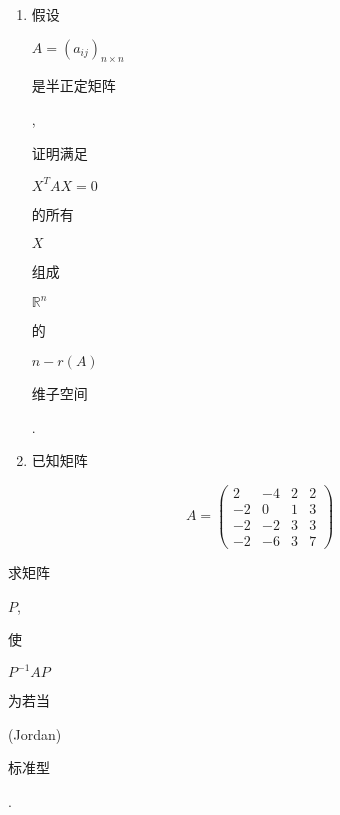 \documentclass[10pt]{article}
\begin{document}
\begin{enumerate}
  \item \begin{CJK}{UTF8}{mj}假设\end{CJK} $A=\left(a_{i j}\right)_{n \times n}$ \begin{CJK}{UTF8}{mj}是半正定矩阵\end{CJK}, \begin{CJK}{UTF8}{mj}证明满足\end{CJK} $X^{T} A X=0$ \begin{CJK}{UTF8}{mj}的所有\end{CJK} $X$ \begin{CJK}{UTF8}{mj}组成\end{CJK} $\mathbb{R}^{n}$ \begin{CJK}{UTF8}{mj}的\end{CJK} $n-r(A)$ \begin{CJK}{UTF8}{mj}维子空间\end{CJK}.

  \item \begin{CJK}{UTF8}{mj}已知矩阵\end{CJK}

\end{enumerate}
$$
A=\left(\begin{array}{cccc}
2 & -4 & 2 & 2 \\
-2 & 0 & 1 & 3 \\
-2 & -2 & 3 & 3 \\
-2 & -6 & 3 & 7
\end{array}\right)
$$
\begin{CJK}{UTF8}{mj}求矩阵\end{CJK} $P$, \begin{CJK}{UTF8}{mj}使\end{CJK} $P^{-1} A P$ \begin{CJK}{UTF8}{mj}为若当\end{CJK} (Jordan) \begin{CJK}{UTF8}{mj}标准型\end{CJK}.
\end{document}
